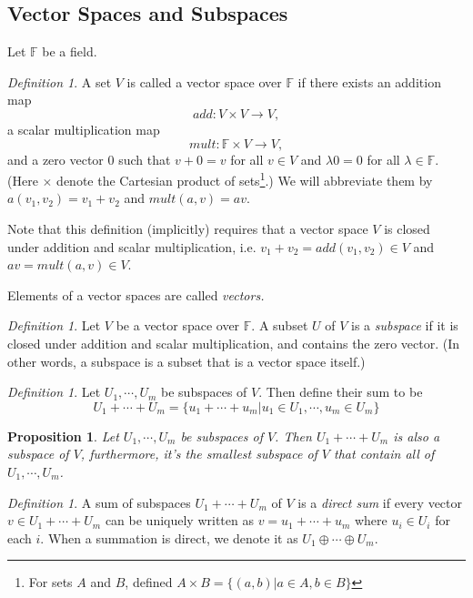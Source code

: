 \documentclass[12pt]{amsart}
\newcommand{\fff}[0]{\mathbb{F}}
\newtheorem{proposition}[theorem]{Proposition}
\theoremstyle{remark}
\newtheorem{definition}[theorem]{Definition}
\numberwithin{equation}{section}
\begin{document}
\subsection{Vector Spaces and Subspaces}
Let $\fff$ be a field.
\begin{definition}\label{def:vs}
	A set $V$ is called a vector space over $\fff$ if there exists an addition map
	\[add:V\times V\to V,\]
	a scalar multiplication map
	\[mult:\fff\times V\to V,\]
	and a zero vector $0$ such that $v+0=v$ for all $v\in V$ and $\lambda 0=0$ for all $\lambda\in\fff$.
	(Here $\times$ denote the Cartesian product of sets\footnote{For sets $A$ and $B$, defined $A\times B=\{(a,b)|a\in A,b\in B\}$}.) We will abbreviate them by $a(v_1,v_2)=v_1+v_2$ and $mult(a,v)=av$.
	
	Note that this definition (implicitly) requires that a vector space $V$ is closed under addition and scalar multiplication, i.e. $v_1+v_2=add(v_1,v_2)\in V$ and $av = mult(a,v)\in V$.
	
	Elements of a vector spaces are called \emph{vectors.}
\end{definition}

\begin{definition}\label{def:subspace}
	Let $V$ be a vector space over $\fff$. A subset $U$ of $V$ is a \emph{subspace} if it is closed under addition and scalar multiplication, and contains the zero vector. (In other words, a subspace is a subset that is a vector space itself.)
\end{definition}
\begin{definition}\label{def:sum}
	Let $U_1,\cdots,U_m$ be subspaces of $V$. Then define their sum to be
	\[U_1+\cdots+U_m = \{u_1+\cdots+u_m|u_1\in U_1,\cdots,u_m\in U_m\}\]
\end{definition}
\begin{proposition}
	Let $U_1,\cdots,U_m$ be subspaces of $V$. Then $U_1+\cdots+U_m$ is also a subspace of $V$, furthermore, it's the smallest subspace of $V$ that contain all of $U_1,\cdots,U_m$.
\end{proposition}
\begin{definition}
	A sum of subspaces $U_1+\cdots+U_m$ of $V$ is a \emph{direct sum} if every vector $v\in U_1+\cdots+U_m$ can be uniquely written as $v=u_1+\cdots+u_m$ where $u_i\in U_i$ for each $i$. When a summation is direct, we denote it as $U_1\oplus\cdots\oplus U_m$.
\end{definition}
\end{document}
